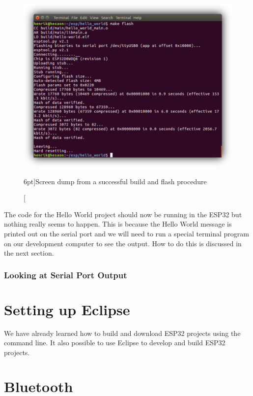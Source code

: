 \documentclass{tufte-book}
\begin{document}
\begin{figure}
	\includegraphics{hello_world_make_flash_shadowed.png}
	\caption[ $n$. ][6pt]{Screen dump from a successful build and flash procedure}
	\label{fig:hello_world_make_flash_shadowed}
\end{figure}

The code for the Hello World project should now be running in the ESP32 but nothing really seems to happen. This is because the Hello World message is printed out on the serial port and we will need to run a special terminal program on our development computer to see the output. How to do this is discussed in the next section.

\subsection{Looking at Serial Port Output}

\chapter{Setting up Eclipse}


We have already learned how to build and download ESP32 projects using the command line. It also possible to use Eclipse to develop and build ESP32 projects.

\chapter{Bluetooth}
\end{document}
